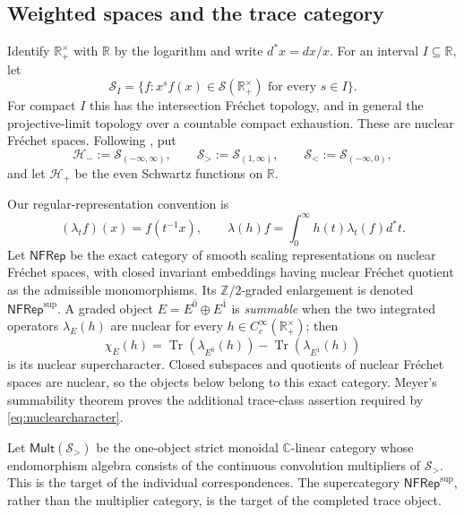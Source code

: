 \documentclass[11pt]{amsart}
\theoremstyle{definition}
\theoremstyle{remark}
\newcommand{\C}{\mathbb C}
\newcommand{\R}{\mathbb R}
\newcommand{\Z}{\mathbb Z}
\begin{document}
\subsection{Weighted spaces and the trace category}

Identify $\R_+^\times$ with $\R$ by the logarithm and write
$d^*x=dx/x$.  For an interval $I\subseteq\R$, let
\begin{equation}\label{eq:weightedSchwartz}
 \mathcal S_I=\{f:x^sf(x)\in\mathcal S(\R_+^\times)
                  \text{ for every }s\in I\}.
\end{equation}
For compact $I$ this has the intersection Fr\'echet topology, and in
general the projective-limit topology over a countable compact exhaustion.
These are nuclear Fr\'echet spaces.  Following
\cite[\S2]{MeyerZeta}, put
\begin{equation}\label{eq:Meyerspaces}
 \mathcal H_-:=\mathcal S_{(-\infty,\infty)},\qquad
 \mathcal S_>:=\mathcal S_{(1,\infty)},\qquad
 \mathcal S_<:=\mathcal S_{(-\infty,0)},
\end{equation}
and let $\mathcal H_+$ be the even Schwartz functions on $\R$.

Our regular-representation convention is
\begin{equation}\label{eq:dilationconvention}
 (\lambda_t f)(x)=f(t^{-1}x),\qquad
 \lambda(h)f=\int_0^\infty h(t)\lambda_t(f)d^*t.
\end{equation}
Let $\mathsf{NFRep}$ be the exact category of smooth scaling
representations on nuclear Fr\'echet spaces, with closed invariant
embeddings having nuclear Fr\'echet quotient as the admissible
monomorphisms.  Its $\Z/2$-graded enlargement is denoted
$\mathsf{NFRep}^{\mathrm{sup}}$.  A graded object $E=E^{\bar0}\oplus
E^{\bar1}$ is \emph{summable} when the two integrated operators
$\lambda_E(h)$ are nuclear for every $h\in C_c^\infty(\R_+^\times)$; then
\begin{equation}\label{eq:nuclearcharacter}
 \chi_E(h)=\operatorname{Tr}(\lambda_{E^{\bar0}}(h))
           -\operatorname{Tr}(\lambda_{E^{\bar1}}(h))
\end{equation}
is its nuclear supercharacter.  Closed subspaces and quotients of nuclear
Fr\'echet spaces are nuclear, so the objects below belong to this exact
category.  Meyer's summability theorem
\cite[Proposition~5.6]{MeyerZeta} proves the additional trace-class
assertion required by \eqref{eq:nuclearcharacter}.

Let $\mathsf{Mult}(\mathcal S_>)$ be the one-object strict monoidal
$\C$-linear category whose endomorphism algebra consists of the continuous
convolution multipliers of $\mathcal S_>$.  This is the target of the
individual correspondences.  The supercategory
$\mathsf{NFRep}^{\mathrm{sup}}$, rather than the multiplier category, is the
target of the completed trace object.
\end{document}
